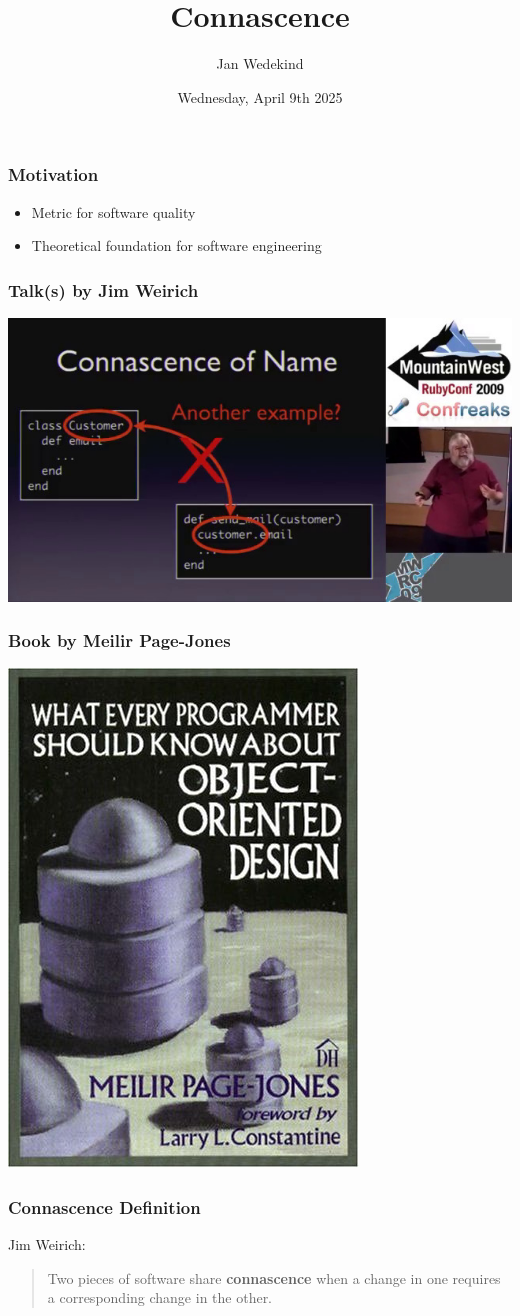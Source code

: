 \documentclass[aspectratio=169,12pt]{beamer}
\title{Connascence}
\author{Jan Wedekind}
\date{Wednesday, April 9th 2025}
\begin{document}
\frame{\titlepage}

\begin{frame}
  \frametitle{Motivation}
  \begin{itemize}
    \item Metric for software quality
    \item Theoretical foundation for software engineering
  \end{itemize}
\end{frame}

\begin{frame}
  \frametitle{Talk(s) by Jim Weirich}
  \begin{center}
    \href{https://www.youtube.com/watch?v=q85rdBMe9GY}{\includegraphics[height=.8\textheight]{weirich}}
  \end{center}
\end{frame}

\begin{frame}
  \frametitle{Book by Meilir Page-Jones}
  \begin{center}
    \includegraphics[height=.8\textheight]{meilir}
  \end{center}
\end{frame}

\begin{frame}
  \frametitle{Connascence Definition}
  Jim Weirich:\bigskip\\
  \begin{quote}
    Two pieces of software share \textbf{connascence} when a change in one requires a corresponding change in the other.
  \end{quote}
\end{frame}
\end{document}
